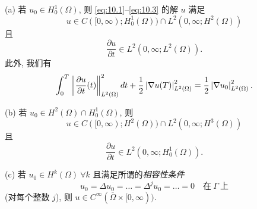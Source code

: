 \begin{theorem}
\label{thm:10.2}
(a) 若 $u_0\in H_0^1(\Omega)$, 则 \eqref{eq:10.1}--\eqref{eq:10.3} 的解
$u$ 满足
\begin{equation*}
u\in C([0,\infty);H_0^1(\Omega))\cap L^2(0,\infty;H^2(\Omega))
\end{equation*}
且
\begin{equation*}
\frac{\partial u}{\partial t}\in L^2(0,\infty;L^2(\Omega)).
\end{equation*}
此外, 我们有
\begin{equation}
\int_0^T\left\|\frac{\partial u}{\partial t}(t)\right\|^2_{L^2(\Omega)}dt
+\frac12\left|\nabla u(T)\right|^2_{L^2(\Omega)}
=\frac12\left|\nabla u_0\right|^2_{L^2(\Omega)}.
\label{eq:10.7}
\end{equation}

(b) 若 $u_0\in H^2(\Omega)\cap H_0^1(\Omega)$, 则
\begin{equation*}
u\in C([0,\infty);H^2(\Omega))\cap L^2(0,\infty;H^3(\Omega))
\end{equation*}
且
\begin{equation*}
\frac{\partial u}{\partial t}\in L^2(0,\infty;H_0^1(\Omega)).
\end{equation*}

(c) 若 $u_0\in H^k(\Omega)\ \forall k$ 且满足所谓的\emph{相容性条件}
\begin{equation}
u_0=\Delta u_0=\dots=\Delta^ju_0=\dots=0\quad\text{在}\ \Gamma\ \text{上}
\label{eq:10.8}
\end{equation}
(对每个整数 $j$), 则 $u\in C^\infty(\overline\Omega\times[0,\infty))$.
\end{theorem}

